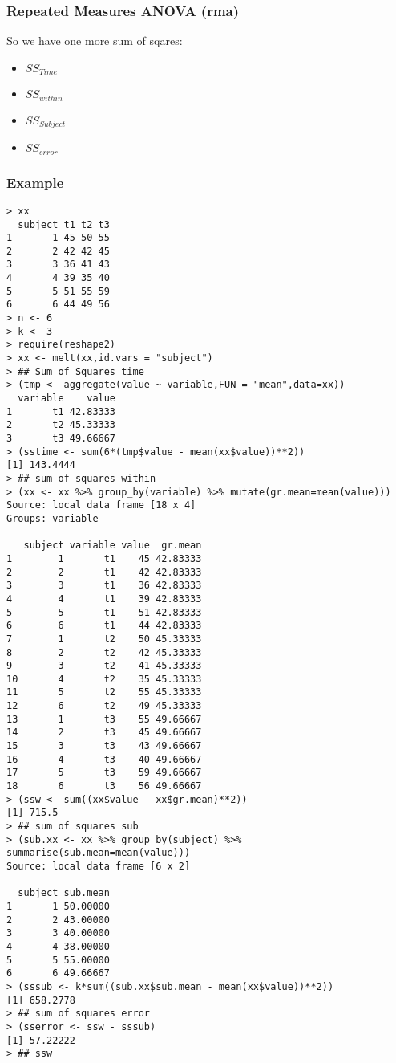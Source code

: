 \begin{frame}\frametitle{Repeated Measures ANOVA (rma)}
So we have one more sum of sqares:
  \begin{itemize}
  \item $SS_{Time}$
  \item $SS_{within}$
  \item $SS_{Subject}$
  \item $SS_{error}$
  \end{itemize}
\end{frame}

\begin{frame}\frametitle{Example}\scriptsize
\begin{verbatim}
> xx
  subject t1 t2 t3
1       1 45 50 55
2       2 42 42 45
3       3 36 41 43
4       4 39 35 40
5       5 51 55 59
6       6 44 49 56
> n <- 6
> k <- 3
> require(reshape2)
> xx <- melt(xx,id.vars = "subject")  
> ## Sum of Squares time
> (tmp <- aggregate(value ~ variable,FUN = "mean",data=xx))
  variable    value
1       t1 42.83333
2       t2 45.33333
3       t3 49.66667
> (sstime <- sum(6*(tmp$value - mean(xx$value))**2))
[1] 143.4444
> ## sum of squares within
> (xx <- xx %>% group_by(variable) %>% mutate(gr.mean=mean(value)))
Source: local data frame [18 x 4]
Groups: variable

   subject variable value  gr.mean
1        1       t1    45 42.83333
2        2       t1    42 42.83333
3        3       t1    36 42.83333
4        4       t1    39 42.83333
5        5       t1    51 42.83333
6        6       t1    44 42.83333
7        1       t2    50 45.33333
8        2       t2    42 45.33333
9        3       t2    41 45.33333
10       4       t2    35 45.33333
11       5       t2    55 45.33333
12       6       t2    49 45.33333
13       1       t3    55 49.66667
14       2       t3    45 49.66667
15       3       t3    43 49.66667
16       4       t3    40 49.66667
17       5       t3    59 49.66667
18       6       t3    56 49.66667
> (ssw <- sum((xx$value - xx$gr.mean)**2))
[1] 715.5
> ## sum of squares sub
> (sub.xx <- xx %>% group_by(subject) %>% summarise(sub.mean=mean(value)))
Source: local data frame [6 x 2]

  subject sub.mean
1       1 50.00000
2       2 43.00000
3       3 40.00000
4       4 38.00000
5       5 55.00000
6       6 49.66667
> (sssub <- k*sum((sub.xx$sub.mean - mean(xx$value))**2))
[1] 658.2778
> ## sum of squares error
> (sserror <- ssw - sssub)
[1] 57.22222
> ## ssw
\end{verbatim}
\end{frame}


